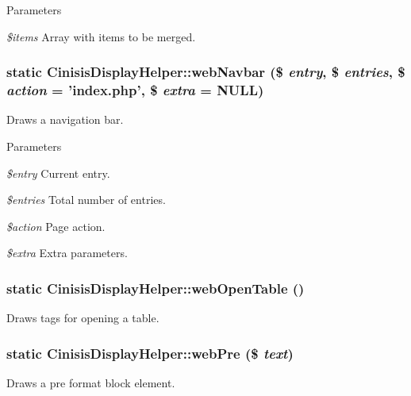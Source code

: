 \begin{DoxyParams}{Parameters}
\item[{\em \$items}]Array with items to be merged. \end{DoxyParams}
\hypertarget{classCinisisDisplayHelper_a291e2da97fd646e7fa34fb92879fc3d6}{
\subsubsection[{webNavbar}]{\setlength{\rightskip}{0pt plus 5cm}static CinisisDisplayHelper::webNavbar (\$ {\em entry}, \/  \$ {\em entries}, \/  \$ {\em action} = {\ttfamily 'index.php'}, \/  \$ {\em extra} = {\ttfamily NULL})}}
\label{classCinisisDisplayHelper_a291e2da97fd646e7fa34fb92879fc3d6}
Draws a navigation bar.


\begin{DoxyParams}{Parameters}
\item[{\em \$entry}]Current entry.\item[{\em \$entries}]Total number of entries.\item[{\em \$action}]Page action.\item[{\em \$extra}]Extra parameters. \end{DoxyParams}
\hypertarget{classCinisisDisplayHelper_a4028def92d8511e525251ec7ab06246d}{
\subsubsection[{webOpenTable}]{\setlength{\rightskip}{0pt plus 5cm}static CinisisDisplayHelper::webOpenTable ()}}
\label{classCinisisDisplayHelper_a4028def92d8511e525251ec7ab06246d}
Draws tags for opening a table. \hypertarget{classCinisisDisplayHelper_a528283a8b16090918f1878dca5ee24fb}{
\subsubsection[{webPre}]{\setlength{\rightskip}{0pt plus 5cm}static CinisisDisplayHelper::webPre (\$ {\em text})}}
\label{classCinisisDisplayHelper_a528283a8b16090918f1878dca5ee24fb}
Draws a pre format block element.


